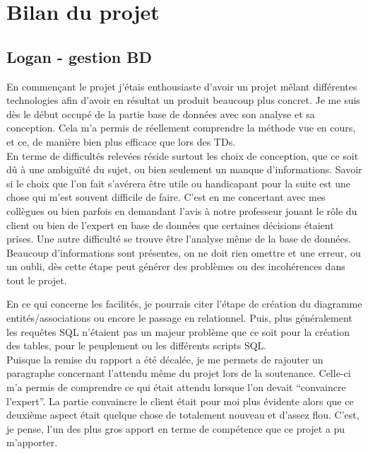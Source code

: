 \documentclass[10pt, a4paper]{article}
\begin{document}
\section{Bilan du projet}

\subsection{Logan - gestion BD}

En commençant le projet j'étais enthousiaste d'avoir un projet mêlant différentes
technologies afin d'avoir en résultat un produit beaucoup plus concret. Je me suis dès le
début occupé de la partie base de données avec son analyse et sa conception. Cela m'a
permis de réellement comprendre la méthode vue en cours, et ce, de manière bien plus efficace
que lors des TDs.\\

En terme de difficultés relevées réside surtout les choix de conception, que ce soit dû à une
ambiguïté du sujet, ou bien seulement un manque d'informations. Savoir si le choix que l'on fait
s'avérera être utile ou handicapant pour la suite est une chose qui m'est souvent difficile de
faire. C'est en me concertant avec mes collègues ou bien parfois en demandant l'avis à notre professeur jouant le rôle du client ou bien de l'expert en base de données que certaines décisions étaient prises. Une autre difficulté se trouve être l'analyse même de la base de données. Beaucoup
d'informations sont présentes, on ne doit rien omettre et une erreur, ou un oubli, dès cette
étape peut générer des problèmes ou des incohérences dans tout le projet.

En ce qui concerne les facilités, je pourrais citer l'étape de création du diagramme
entités/associations ou encore le passage en relationnel. Puis, plus généralement les requêtes
SQL n'étaient pas un majeur problème que ce soit pour la création des tables, pour le
peuplement ou les différents scripts SQL.\\

Puisque la remise du rapport a été décalée, je me permets de rajouter un paragraphe concernant l'attendu même du projet lors de la soutenance.
Celle-ci m'a permis de comprendre ce qui était attendu lorsque l'on devait ``convaincre l'expert''. La partie convaincre le client était pour moi plus évidente alors que ce deuxième aspect était quelque chose de totalement nouveau et d'assez flou. C'est, je pense, l'un des plus gros apport en terme de compétence que ce projet a pu m'apporter.\\
\end{document}
